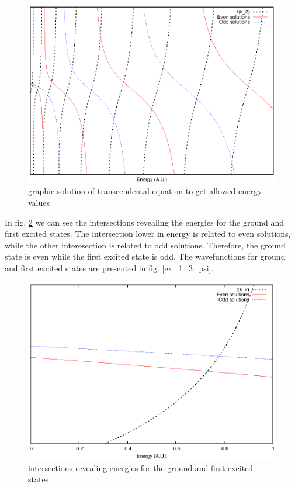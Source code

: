 \documentclass{article}
\begin{document}
\begin{figure}
\centering
\includegraphics{graph_sol_ex_1_3.eps}
\caption{graphic solution of transcendental equation to get allowed energy values}
\label{graph_sol_ex_1_3}
\end{figure}

In fig. \ref{ex_1_3_ground_energies} we can see the intersections revealing the energies for the ground and first excited states. The intersection lower in energy is related to even solutions, while the other interesection is related to odd solutions. Therefore, the ground state is even while the first excited state is odd. The wavefunctions for ground and first excited states are presented in fig. \ref{ex_1_3_psi}.

\begin{figure}
\centering
\includegraphics{ex_1_3_ground_energies.eps}
\caption{intersections revealing energies for the ground and first excited states}
\label{ex_1_3_ground_energies}
\end{figure}
\end{document}
